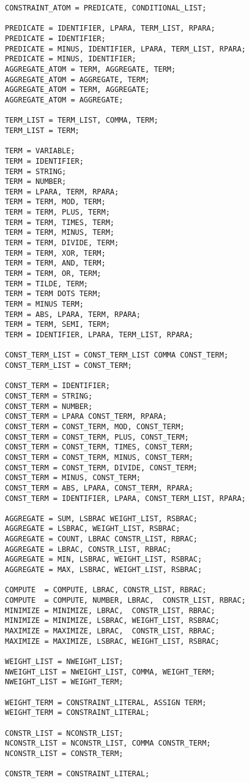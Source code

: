 \begin{verbatim}
CONSTRAINT_ATOM = PREDICATE, CONDITIONAL_LIST;

PREDICATE = IDENTIFIER, LPARA, TERM_LIST, RPARA;
PREDICATE = IDENTIFIER;
PREDICATE = MINUS, IDENTIFIER, LPARA, TERM_LIST, RPARA;
PREDICATE = MINUS, IDENTIFIER;
AGGREGATE_ATOM = TERM, AGGREGATE, TERM;
AGGREGATE_ATOM = AGGREGATE, TERM;
AGGREGATE_ATOM = TERM, AGGREGATE;
AGGREGATE_ATOM = AGGREGATE;

TERM_LIST = TERM_LIST, COMMA, TERM;
TERM_LIST = TERM;

TERM = VARIABLE;
TERM = IDENTIFIER;
TERM = STRING;
TERM = NUMBER;
TERM = LPARA, TERM, RPARA;
TERM = TERM, MOD, TERM;
TERM = TERM, PLUS, TERM;
TERM = TERM, TIMES, TERM;
TERM = TERM, MINUS, TERM;
TERM = TERM, DIVIDE, TERM;
TERM = TERM, XOR, TERM;
TERM = TERM, AND, TERM;
TERM = TERM, OR, TERM;
TERM = TILDE, TERM;
TERM = TERM DOTS TERM;
TERM = MINUS TERM;
TERM = ABS, LPARA, TERM, RPARA;
TERM = TERM, SEMI, TERM;
TERM = IDENTIFIER, LPARA, TERM_LIST, RPARA;

CONST_TERM_LIST = CONST_TERM_LIST COMMA CONST_TERM;
CONST_TERM_LIST = CONST_TERM;

CONST_TERM = IDENTIFIER;
CONST_TERM = STRING;
CONST_TERM = NUMBER;
CONST_TERM = LPARA CONST_TERM, RPARA;
CONST_TERM = CONST_TERM, MOD, CONST_TERM;
CONST_TERM = CONST_TERM, PLUS, CONST_TERM;
CONST_TERM = CONST_TERM, TIMES, CONST_TERM;
CONST_TERM = CONST_TERM, MINUS, CONST_TERM;
CONST_TERM = CONST_TERM, DIVIDE, CONST_TERM;
CONST_TERM = MINUS, CONST_TERM;
CONST_TERM = ABS, LPARA, CONST_TERM, RPARA;
CONST_TERM = IDENTIFIER, LPARA, CONST_TERM_LIST, RPARA;

AGGREGATE = SUM, LSBRAC WEIGHT_LIST, RSBRAC;
AGGREGATE = LSBRAC, WEIGHT_LIST, RSBRAC;
AGGREGATE = COUNT, LBRAC CONSTR_LIST, RBRAC;
AGGREGATE = LBRAC, CONSTR_LIST, RBRAC;
AGGREGATE = MIN, LSBRAC, WEIGHT_LIST, RSBRAC;
AGGREGATE = MAX, LSBRAC, WEIGHT_LIST, RSBRAC;

COMPUTE  = COMPUTE, LBRAC, CONSTR_LIST, RBRAC;
COMPUTE  = COMPUTE, NUMBER, LBRAC,  CONSTR_LIST, RBRAC;
MINIMIZE = MINIMIZE, LBRAC,  CONSTR_LIST, RBRAC;
MINIMIZE = MINIMIZE, LSBRAC, WEIGHT_LIST, RSBRAC;
MAXIMIZE = MAXIMIZE, LBRAC,  CONSTR_LIST, RBRAC;
MAXIMIZE = MAXIMIZE, LSBRAC, WEIGHT_LIST, RSBRAC;

WEIGHT_LIST = NWEIGHT_LIST;
NWEIGHT_LIST = NWEIGHT_LIST, COMMA, WEIGHT_TERM;
NWEIGHT_LIST = WEIGHT_TERM;

WEIGHT_TERM = CONSTRAINT_LITERAL, ASSIGN TERM;
WEIGHT_TERM = CONSTRAINT_LITERAL;

CONSTR_LIST = NCONSTR_LIST;
NCONSTR_LIST = NCONSTR_LIST, COMMA CONSTR_TERM;
NCONSTR_LIST = CONSTR_TERM;

CONSTR_TERM = CONSTRAINT_LITERAL;
\end{verbatim}